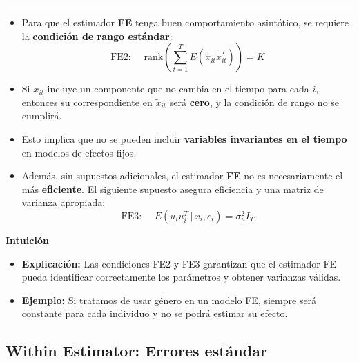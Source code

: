 \documentclass[12pt]{article}
\begin{document}
\hrule

\begin{itemize}
    \item Para que el estimador \textbf{FE} tenga buen comportamiento asintótico, se requiere la \textbf{condición de rango estándar}:  
    \[
    \text{FE2: } \quad \text{rank}\!\left(\sum_{t=1}^T E(\tilde{x}_{it}\tilde{x}_{it}^T)\right) = K
    \]
    
    \item Si $x_{it}$ incluye un componente que no cambia en el tiempo para cada $i$, entonces su correspondiente en $\tilde{x}_{it}$ será \textbf{cero}, y la condición de rango no se cumplirá.
    
    \item Esto implica que no se pueden incluir \textbf{variables invariantes en el tiempo} en modelos de efectos fijos.
    
    \item Además, sin supuestos adicionales, el estimador \textbf{FE} no es necesariamente el más \textbf{eficiente}.  
    El siguiente supuesto asegura eficiencia y una matriz de varianza apropiada:  
    \[
    \text{FE3: } \quad E(u_i u_i^T \,|\, x_i, c_i) = \sigma_u^2 I_T
    \]
\end{itemize}

\noindent\textbf{Intuición}
\begin{itemize}
    \item \textbf{Explicación:} Las condiciones FE2 y FE3 garantizan que el estimador FE pueda identificar correctamente los parámetros y obtener varianzas válidas.
    \item \textbf{Ejemplo:} Si tratamos de usar género en un modelo FE, siempre será constante para cada individuo y no se podrá estimar su efecto.
\end{itemize}

\subsection*{\noindent\textbf{Within Estimator: Errores estándar}}
\end{document}
